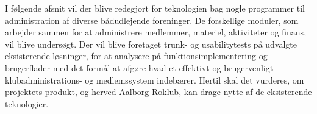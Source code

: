\label{sec:teknologianalyse}
I følgende afsnit vil der blive redegjort for teknologien bag nogle programmer til administration af diverse bådudlejende foreninger. De forskellige moduler, som arbejder sammen for at administrere medlemmer, materiel, aktiviteter og finans, vil blive undersøgt. Der vil blive foretaget trunk- og usabilitytests på udvalgte eksisterende løsninger, for at analysere på funktionsimplementering og brugerflader med det formål at afgøre hvad et effektivt og brugervenligt klubadministrations- og medlemssystem indebærer. Hertil skal det vurderes, om projektets produkt, og herved Aalborg Roklub, kan drage nytte af de eksisterende teknologier.